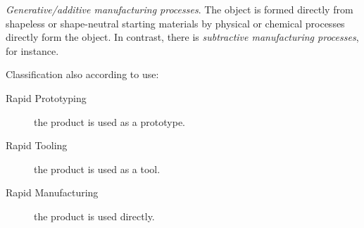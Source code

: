 \begin{frame}
    \par \textit{Generative/additive manufacturing processes}.
    The object is formed directly from shapeless or shape-neutral starting materials by physical or chemical processes directly form the object.
    In contrast, there is \textit{subtractive manufacturing processes}, for instance.
    \par Classification also according to use:
    \begin{description}
        \item[Rapid Prototyping] the product is used as a prototype.
        \item[Rapid Tooling] the product is used as a tool.
        \item[Rapid Manufacturing] the product is used directly.
    \end{description}
\end{frame}